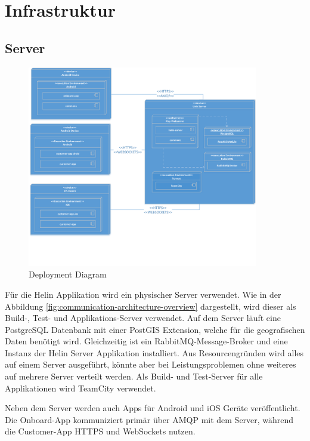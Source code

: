 \newpage

\chapter{Infrastruktur}

\section{Server}

\begin{figure}[H]
	\centering
	\includegraphics[width=0.9\textwidth]{images/DeploymentDiagram.pdf}
	\caption{Deployment Diagram}
	\label{fig:deployment-diagram}
\end{figure}

Für die Helin Applikation wird ein physischer Server verwendet. Wie in der Abbildung \ref{fig:communication-architecture-overview} dargestellt, wird dieser als Build-, Test- und Applikations-Server verwendet. 
Auf dem Server läuft eine PostgreSQL Datenbank mit einer PostGIS Extension, welche für die geografischen Daten benötigt wird. Gleichzeitig ist ein RabbitMQ-Message-Broker und eine Instanz der Helin Server Applikation installiert. Aus Resourcengründen wird alles auf einem Server ausgeführt, könnte aber bei Leistungsproblemen ohne weiteres auf mehrere Server verteilt werden. Als Build- und Test-Server für alle Applikationen wird TeamCity verwendet. 

Neben dem Server werden auch Apps für Android und iOS Geräte veröffentlicht. Die Onboard-App kommuniziert primär über AMQP mit dem Server, während die Customer-App HTTPS und WebSockets nutzen.




